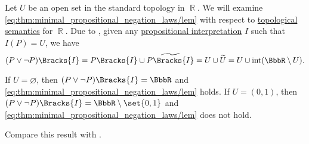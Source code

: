 \begin{example}\label{ex:topological_semantics_lem_counterexample}
  Let \( U \) be an open set in the standard topology in \( \BbbR \). We will examine \eqref{eq:thm:minimal_propositional_negation_laws/lem} with respect to \hyperref[def:propositional_topological_semantics]{topological semantics} for \( \BbbR \). Due to , given any \hyperref[def:propositional_valuation]{propositional interpretation} \( I \) such that \( I(P) = U \), we have
  \begin{equation*}
    (P \vee \neg P)\Bracks{I}
    =
    P\Bracks{I} \cup \widetilde{P\Bracks{I}}
    =
    U \cup \widetilde{U}
    =
    U \cup \Int(\BbbR \setminus U).
  \end{equation*}

  If \( U = \varnothing \), then \( (P \vee \neg P)\Bracks{I} = \BbbR \) and \eqref{eq:thm:minimal_propositional_negation_laws/lem} holds. If \( U = (0, 1) \), then \( (P \vee \neg P)\Bracks{I} = \BbbR \setminus \set{ 0, 1 } \) and \eqref{eq:thm:minimal_propositional_negation_laws/lem} does not hold.

  Compare this result with .
\end{example}

